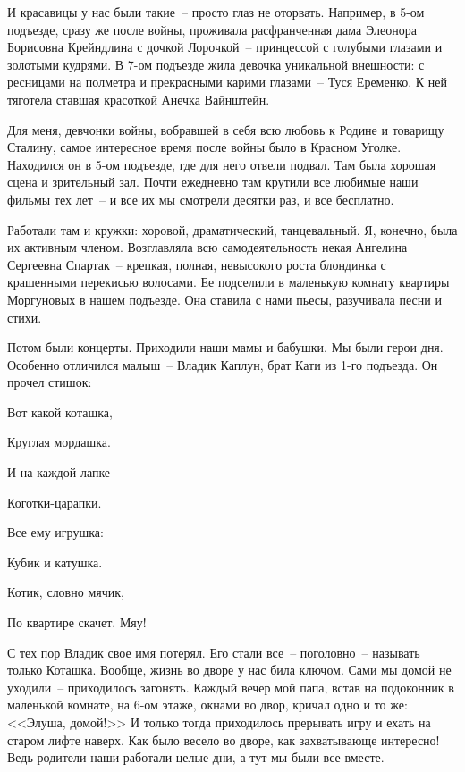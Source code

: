 И красавицы у нас были такие~-- просто глаз не оторвать. Например, в 5-ом подъезде, сразу же после войны, проживала расфранченная дама Элеонора Борисовна Крейндлина с дочкой Лорочкой~-- принцессой с голубыми глазами и золотыми кудрями. В 7-ом подъезде жила девочка уникальной внешности: с ресницами на полметра и прекрасными карими глазами~-- Туся Еременко. К ней тяготела ставшая красоткой Анечка Вайнштейн.

Для меня, девчонки войны, вобравшей в себя всю любовь к Родине и товарищу Сталину, самое интересное время после войны было в Красном Уголке. Находился он в 5-ом подъезде, где для него отвели подвал. Там была хорошая сцена и зрительный зал. Почти ежедневно там крутили все любимые наши фильмы тех лет~-- и все их мы смотрели десятки раз, и все бесплатно.

Работали там и кружки: хоровой, драматический, танцевальный. Я, конечно, была их активным членом. Возглавляла всю самодеятельность некая Ангелина Сергеевна Спартак~-- крепкая, полная, невысокого роста блондинка с крашенными перекисью волосами. Ее подселили в маленькую комнату квартиры Моргуновых в нашем подъезде. Она ставила с нами пьесы, разучивала песни и стихи.

Потом были концерты. Приходили наши мамы и бабушки. Мы были герои дня. Особенно отличился малыш~-- Владик Каплун, брат Кати из 1-го подъезда. Он прочел стишок:

\indent

{\itshape

    Вот какой коташка,
    
    Круглая мордашка.
    
    И на каждой лапке
    
    Коготки-царапки.
    
    Все ему игрушка:
    
    Кубик и катушка.
    
    Котик, словно мячик,
    
    По квартире скачет. Мяу!
    
}

\indent

С тех пор Владик свое имя потерял. Его стали все~-- поголовно~-- называть только Коташка. Вообще, жизнь во дворе у нас била ключом. Сами мы домой не уходили~-- приходилось загонять. Каждый вечер мой папа, встав на подоконник в маленькой комнате, на 6-ом этаже, окнами во двор, кричал одно и то же: <<Элуша, домой!>> И только тогда приходилось прерывать игру и ехать на старом лифте наверх. Как было весело во дворе, как захватывающе интересно! Ведь родители наши работали целые дни, а тут мы были все вместе.

